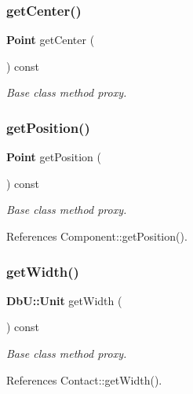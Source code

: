 \subsubsection{\texorpdfstring{get\+Center()}{getCenter()}}
{\footnotesize\ttfamily \textbf{ Point} get\+Center (\begin{DoxyParamCaption}{ }\end{DoxyParamCaption}) const\hspace{0.3cm}{\ttfamily [inline]}}

{\itshape Base class method proxy.} \mbox{\label{classKatabatic_1_1AutoContact_a4fa9bb12d79f6645884d567986c9b0a5}} 
\subsubsection{\texorpdfstring{get\+Position()}{getPosition()}}
{\footnotesize\ttfamily \textbf{ Point} get\+Position (\begin{DoxyParamCaption}{ }\end{DoxyParamCaption}) const\hspace{0.3cm}{\ttfamily [inline]}}

{\itshape Base class method proxy.} 

References Component\+::get\+Position().

\mbox{\label{classKatabatic_1_1AutoContact_a9c63fe7288748eaf5332ca796a36d872}} 
\subsubsection{\texorpdfstring{get\+Width()}{getWidth()}}
{\footnotesize\ttfamily \textbf{ Db\+U\+::\+Unit} get\+Width (\begin{DoxyParamCaption}{ }\end{DoxyParamCaption}) const\hspace{0.3cm}{\ttfamily [inline]}}

{\itshape Base class method proxy.} 

References Contact\+::get\+Width().

